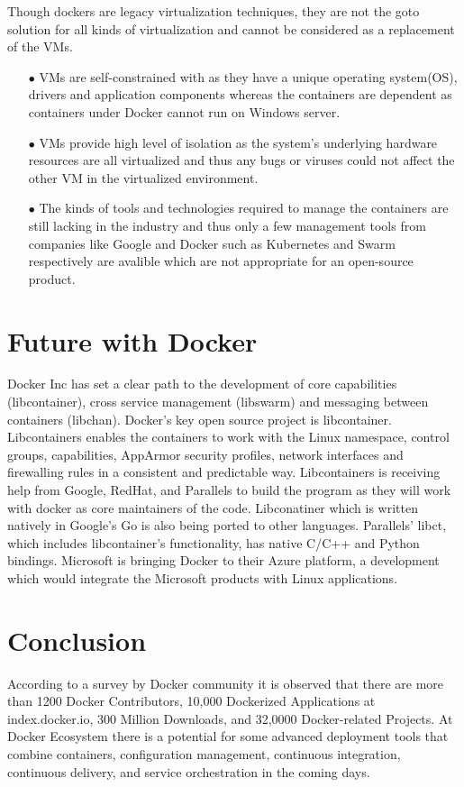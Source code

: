 \documentclass[9pt,twocolumn,twoside]{styles/osajnl}
\begin{document}
Though dockers are legacy virtualization techniques, they are not the
goto solution for all kinds of virtualization and cannot be considered
as a replacement of the VMs.
\begin{itemize}
\item[$\bullet$]VMs are self-constrained with as they have a unique
  operating system(OS), drivers and application components whereas the
  containers are dependent as containers under Docker cannot run on
  Windows server.

\item[$\bullet$]VMs provide high level of isolation as the system's
  underlying hardware resources are all virtualized and thus any bugs
  or viruses could not affect the other VM in the virtualized
  environment.

\item[$\bullet$]The kinds of tools and technologies required to manage
  the containers are still lacking in the industry and thus only a few
  management tools from companies like Google and Docker such as
  Kubernetes and Swarm respectively are avalible which are not
  appropriate for an open-source product.
\end{itemize}
\section{Future with Docker}

Docker Inc has set a clear path to the development of core
capabilities (libcontainer), cross service management (libswarm) and
messaging between containers (libchan). Docker's key open source
project is libcontainer. Libcontainers enables the containers to work
with the Linux namespace, control groups, capabilities, AppArmor
security profiles, network interfaces and firewalling rules in a
consistent and predictable way.  Libcontainers is receiving help from
Google, RedHat, and Parallels to build the program as they will work
with docker as core maintainers of the
code\cite{www-docker-1}. Libconatiner which is written natively in
Google's Go is also being ported to other languages. Parallels' libct,
which includes libcontainer's functionality, has native C/C++ and
Python bindings. Microsoft is bringing Docker to their Azure platform,
a development which would integrate the Microsoft products with
Linux applications.



\section{Conclusion}

According to a survey by Docker community it is observed that there
are more than 1200 Docker Contributors, 10,000 Dockerized Applications
at index.docker.io, 300 Million Downloads, and 32,0000 Docker-related
Projects\cite{www-docker-3}. At Docker Ecosystem there is a potential
for some advanced deployment tools that combine containers,
configuration management, continuous integration, continuous delivery,
and service orchestration in the coming days.



\end{document}
